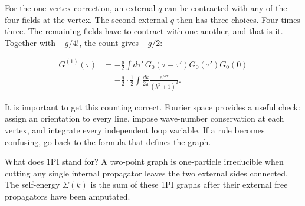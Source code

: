 For the one-vertex correction, an external $q$ can be contracted with any of
the four fields at the vertex. The second external $q$ then has three choices.
Four times three. The remaining fields have to contract with one another, and
that is it. Together with $-g/4!$, the count gives $-g/2$:

\begin{equation}
 \begin{aligned}
 G^{(1)}(\tau)
 &=-\frac{g}{2}\int d\tau'\,
 G_0(\tau-\tau')G_0(\tau')G_0(0)\\
 &=-\frac{g}{2}\cdot\frac{1}{2}
 \int\frac{dk}{2\pi}\frac{e^{ik\tau}}{(k^2+1)^2}.
 \end{aligned}
 \label{eq:253a-tadpole-correction}
\end{equation}

It is important to get this counting correct. Fourier space provides a useful
check: assign an orientation to every line, impose wave-number conservation at
each vertex, and integrate every independent loop variable. If a rule becomes
confusing, go back to the formula that defines the graph.

What does 1PI stand for? A two-point graph is one-particle irreducible when
cutting any single internal propagator leaves the two external sides connected.
The self-energy $\Sigma(k)$ is the sum of these 1PI graphs after their external
free propagators have been amputated.

